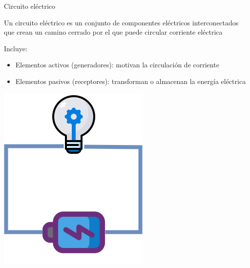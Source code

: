 \documentclass[aspectratio=169, xcolor={usenames,svgnames,dvipsnames}]{beamer}
\begin{document}
\begin{frame}{Circuito eléctrico}
    \begin{minipage}[c]{0.62\linewidth}
        Un \alert{circuito eléctrico} es un conjunto de componentes eléctricos interconectados que crean un \alert{camino cerrado} por el que puede circular corriente eléctrica 
        \vspace{6mm}
        
        Incluye:
        
        \vspace{3mm}
        \begin{itemize}
        \item \alert{Elementos activos} (generadores): motivan la circulación de corriente

        \vspace{2mm}
        \item \alert{Elementos pasivos} (receptores): transforman o almacenan la energía eléctrica
        \end{itemize}
    \end{minipage}
    \hfill%
    \begin{minipage}[c]{0.3\linewidth}
        \includegraphics[width=\linewidth]{../figs/circuito.png}
    \end{minipage}
\end{frame}
\end{document}
